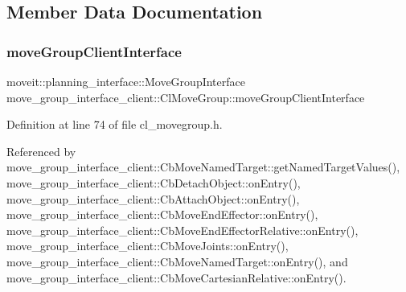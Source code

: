 \subsection{Member Data Documentation}
\mbox{\label{classmove__group__interface__client_1_1ClMoveGroup_a5f0ea9b52695661b17605691168d1f31}} 
\subsubsection{\texorpdfstring{move\+Group\+Client\+Interface}{moveGroupClientInterface}}
{\footnotesize\ttfamily moveit\+::planning\+\_\+interface\+::\+Move\+Group\+Interface move\+\_\+group\+\_\+interface\+\_\+client\+::\+Cl\+Move\+Group\+::move\+Group\+Client\+Interface}



Definition at line 74 of file cl\+\_\+movegroup.\+h.



Referenced by move\+\_\+group\+\_\+interface\+\_\+client\+::\+Cb\+Move\+Named\+Target\+::get\+Named\+Target\+Values(), move\+\_\+group\+\_\+interface\+\_\+client\+::\+Cb\+Detach\+Object\+::on\+Entry(), move\+\_\+group\+\_\+interface\+\_\+client\+::\+Cb\+Attach\+Object\+::on\+Entry(), move\+\_\+group\+\_\+interface\+\_\+client\+::\+Cb\+Move\+End\+Effector\+::on\+Entry(), move\+\_\+group\+\_\+interface\+\_\+client\+::\+Cb\+Move\+End\+Effector\+Relative\+::on\+Entry(), move\+\_\+group\+\_\+interface\+\_\+client\+::\+Cb\+Move\+Joints\+::on\+Entry(), move\+\_\+group\+\_\+interface\+\_\+client\+::\+Cb\+Move\+Named\+Target\+::on\+Entry(), and move\+\_\+group\+\_\+interface\+\_\+client\+::\+Cb\+Move\+Cartesian\+Relative\+::on\+Entry().

\mbox{\label{classmove__group__interface__client_1_1ClMoveGroup_a793ac2c50a1d897afe14a8780940e8ce}} 
